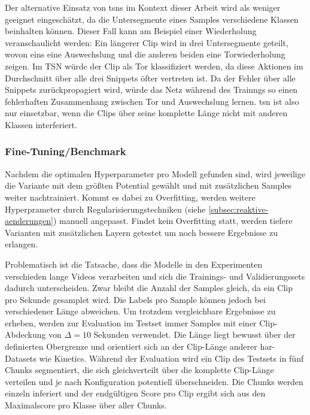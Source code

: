 Der alternative Einsatz von \glspl{tsn} im Kontext dieser Arbeit wird als weniger geeignet eingeschätzt, da die Untersegmente eines Samples verschiedene Klassen beinhalten können.
Dieser Fall kann am Beispiel einer Wiederholung veranschaulicht werden: Ein längerer Clip wird in drei Untersegmente geteilt, wovon eins eine Auswechslung und die anderen beiden eine Torwiederholung zeigen.
Im TSN würde der Clip als Tor klassifiziert werden, da diese Aktionen im Durchschnitt über alle drei Snippets öfter vertreten ist.
Da der Fehler über alle Snippets zurückpropagiert wird, würde das Netz während des Trainngs so einen fehlerhaften Zusammenhang zwischen Tor und Auswechslung lernen.
\gls{tsn} ist also nur einsetzbar, wenn die Clips über seine komplette Länge nicht mit anderen Klassen interferiert.

\subsubsection*{Fine-Tuning/Benchmark}

Nachdem die optimalen Hyperparameter pro Modell gefunden sind, wird jeweilige die Variante mit dem größten Potential gewählt und mit zusätzlichen Samples weiter nachtrainiert.
Kommt es dabei zu Overfitting, werden weitere Hyperprameter durch Regularisierungstechniken (siehe \autoref{subsec:reaktive-aenderungen}) manuell angepasst.
Findet kein Overfitting statt, werden \ggf tiefere Varianten mit zusätzlichen Layern getestet um noch bessere Ergebnisse zu erlangen.

Problematisch ist die Tatsache, dass die Modelle in den Experimenten verschieden lange Videos verarbeiten und sich die Trainings- und Validierungssets dadurch unterscheiden.
Zwar bleibt die Anzahl der Samples gleich, da ein Clip pro Sekunde gesamplet wird.
Die Labels pro Sample können jedoch bei verschiedener Länge abweichen.
Um trotzdem vergleichbare Ergebnisse zu erheben, werden zur Evaluation im Testset immer Samples mit einer Clip-Abdeckung von $\Delta=10$ Sekunden verwendet.
Die Länge liegt bewusst über der definierten Obergrenze und orientiert sich an der Clip-Länge anderer \gls{har}-Datasets wie Kinetics.
Während der Evaluation wird ein Clip des Testsets in fünf Chunks segmentiert, die sich gleichverteilt über die komplette Clip-Länge verteilen und je nach Konfiguration potentiell überschneiden.
Die Chunks werden einzeln inferiert und der endgültigen Score pro Clip ergibt sich aus den Maximalscore pro Klasse über aller Chunks.


